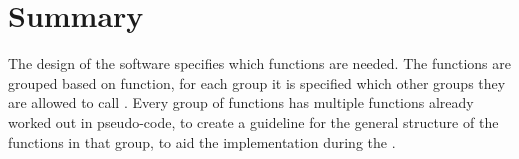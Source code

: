 \section{Summary}
The design of the software specifies which functions are needed. The functions are grouped based on function, for each group it is specified which other groups they are allowed to call . Every group of functions has multiple functions already worked out in pseudo-code, to create a guideline for the general structure of the functions in that group, to aid the implementation during the .